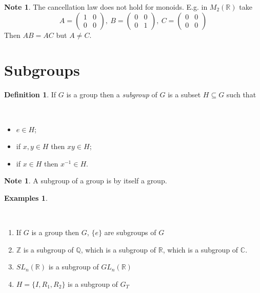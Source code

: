 \documentclass[12pt, letterpaper, oneside]{article}
\theoremstyle{plain}
\theoremstyle{definition}
\newtheorem{definition}[theorem]{Definition}
\newtheorem{examples}[theorem]{Examples}
\newtheorem{note}[theorem]{Note}
\newcommand{\Z}{{\mathbb Z}}
\newcommand{\Q}{{\mathbb Q}}
\newcommand{\R}{{\mathbb R}}
\newcommand{\C}{{\mathbb C}}
\newcommand{\bpm}{\begin{pmatrix}}
\newcommand{\epm}{\end{pmatrix}}
\newcommand{\vs}{\vskip 5mm}
\newcommand{\isep}[1][0]{\setlength{\itemsep}{#1 mm}}
\begin{document}
\begin{note}
The cancellation law does not hold for monoids. E.g. in $M_{2}(\R)$ take
$$
A = \bpm 1 & 0 \\ 0 & 0\epm, \ B = \bpm 0 & 0 \\ 0 & 1\epm, \ C= \bpm 0 & 0 \\ 0 & 0 \epm
$$
Then $AB = AC$ but $A\neq C$.
\end{note}

\newpage





\section{Subgroups}
\label{SEC_SUBGROUPS}

\begin{definition}
\label{DEF_SUBGP}
If $G$ is a group then a \emph{subgroup} of $G$ is a subset $H\subseteq G$ such that

\vskip -13mm

\ 
\begin{itemize}
\isep
\item[(i)]  $e \in H$;
\item[(ii)] if $x, y\in H$ then $xy\in H$;
\item[(iii)] if $x\in H$ then $x^{-1}\in H$. 
\end{itemize}
\end{definition}

\vs


\begin{note}
A subgroup of a group is by itself a group. 
\end{note}


\vs

\begin{examples}\hfill
\label{EX_SUBGROUPS}

\vskip -13mm

\ 
\begin{enumerate}
\item  If $G$ is a group then $G$, $\{e\}$ are subgroups of $G$
\item $\Z$ is a subgroup of $\Q$, which is a subgroup of $\R$, which is a subgroup of $\C$.
\item $SL_{n}(\R)$ is a subgroup of $GL_{n}(\R)$
\item $H= \{ I, R_{1}, R_{2}\}$ is a subgroup of $G_{T}$
\end{enumerate}
\end{examples}
\end{document}
